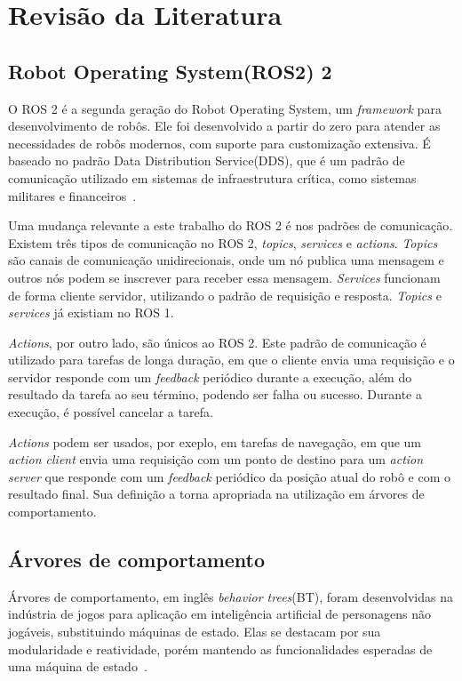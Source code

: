 \documentclass[repeatfields,xlists,xpacks,oneside,yearsonly]{ufrgscca}
\begin{document}
\chapter{Revisão da Literatura}
\label{revisao}

\section{Robot Operating System(ROS2) 2}

O ROS 2 é a segunda geração do Robot Operating System,
um \textit{framework} para desenvolvimento de robôs.
Ele foi desenvolvido a partir do zero para atender as necessidades de robôs modernos,
com suporte para customização extensiva.
É baseado no padrão Data Distribution Service(DDS), que é um padrão de comunicação utilizado
em sistemas de infraestrutura crítica, como sistemas militares e financeiros~\cite{ROS2Article}.

Uma mudança relevante a este trabalho do ROS 2 é nos padrões de comunicação.
Existem três tipos de comunicação no ROS 2, \textit{topics}, \textit{services} e \textit{actions}.
\textit{Topics} são canais de comunicação unidirecionais, onde um nó publica uma mensagem
e outros nós podem se inscrever para receber essa mensagem.
\textit{Services} funcionam de forma cliente servidor, utilizando o padrão de requisição e resposta.
\textit{Topics} e \textit{services} já existiam no ROS 1.

\textit{Actions}, por outro lado, são únicos ao ROS 2.
Este padrão de comunicação é utilizado para tarefas de longa duração,
em que o cliente envia uma requisição e o servidor responde com um \textit{feedback} periódico
durante a execução, além do resultado da tarefa ao seu término, podendo ser falha ou sucesso.
Durante a execução, é possível cancelar a tarefa.

\textit{Actions} podem ser usados, por exeplo, em tarefas de navegação, em que um \textit{action client}
envia uma requisição com um ponto de destino para um \textit{action server}
que responde com um \textit{feedback} periódico da posição atual do robô e
com o resultado final.
Sua definição a torna apropriada na utilização em árvores de comportamento.

\section{Árvores de comportamento}

Árvores de comportamento, em inglês \textit{behavior trees}(BT), foram desenvolvidas
na indústria de jogos para aplicação em inteligência artificial de personagens
não jogáveis, substituindo máquinas de estado.
Elas se destacam por sua modularidade e reatividade, porém mantendo as funcionalidades
esperadas de uma máquina de estado~\cite{BehaviorTree}.
\end{document}

